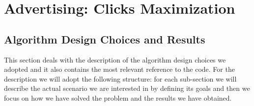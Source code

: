\chapter{Advertising: Clicks Maximization}


\section{Algorithm Design Choices and Results}

This section deals with the description of the algorithm design choices we adopted and
it also contains the most relevant reference to the code.
For the description we will adopt the following structure: for each sub-section we will describe the actual scenario
we are interested in by defining its goals and then we focus on how we have solved the problem and 
the results we have obtained.